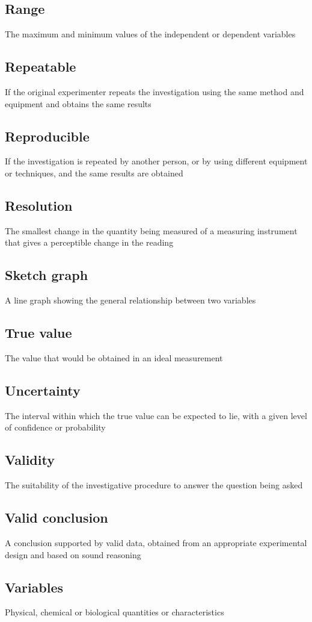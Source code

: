 \documentclass{article}[18pt]
\begin{document}
\subsection{Range}
The maximum and minimum values of the independent or dependent variables
\subsection{Repeatable}
If the original experimenter repeats the investigation using the same method and equipment and obtains the same results
\subsection{Reproducible}
If the investigation is repeated by another person, or by using different equipment or techniques, and the same results are obtained
\subsection{Resolution}
The smallest change in the quantity being measured of a measuring instrument that gives a perceptible change in the reading
\subsection{Sketch graph}
A line graph showing the general relationship between two variables
\subsection{True value}
The value that would be obtained in an ideal measurement
\subsection{Uncertainty}
The interval within which the true value can be expected to lie, with a given level of confidence or probability
\subsection{Validity}
The suitability of the investigative procedure to answer the question being asked
\subsection{Valid conclusion}
A conclusion supported by valid data, obtained from an appropriate experimental design and based on sound reasoning
\subsection{Variables}
Physical, chemical or biological quantities or characteristics 
\end{document}
